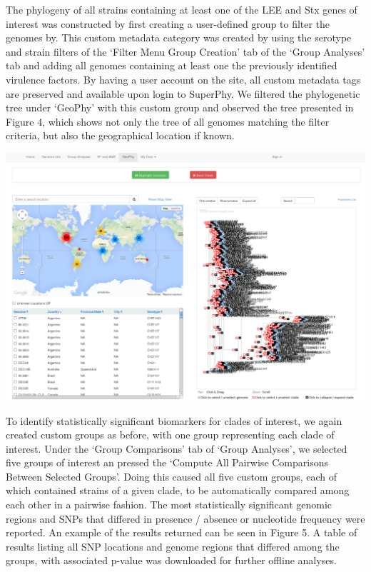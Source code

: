 \documentclass{bmcart}
\begin{document}
The phylogeny of all strains containing at least one of the LEE and Stx genes of interest was constructed by first creating a user-defined group to filter the genomes by. This custom metadata category was created by using the serotype and strain filters of the `Filter Menu Group Creation' tab of the `Group Analyses' tab and adding all genomes containing at least one the previously identified virulence factors. By having a user account on the site, all custom metadata tags are preserved and available upon login to SuperPhy. We filtered the phylogenetic tree under `GeoPhy' with this custom group and observed the tree presented in Figure 4, which shows not only the tree of all genomes matching the filter criteria, but also the geographical location if known.

\includegraphics[width=\textwidth]{images/hazen_lineages.png}

To identify statistically significant biomarkers for clades of interest, we again created custom groups as before, with one group representing each clade of interest. Under the `Group Comparisons' tab of `Group Analyses', we selected five groups of interest an pressed the `Compute All Pairwise Comparisons Between Selected Groups'. Doing this caused all five custom groups, each of which contained strains of a given clade, to be automatically compared among each other in a pairwise fashion. The most statistically significant genomic regions  and SNPs that differed in presence / absence or nucleotide frequency were reported. An example of the results returned can be seen in Figure 5. A table of results listing all SNP locations and genome regions that differed among the groups, with associated p-value was downloaded for further offline analyses.
\end{document}
